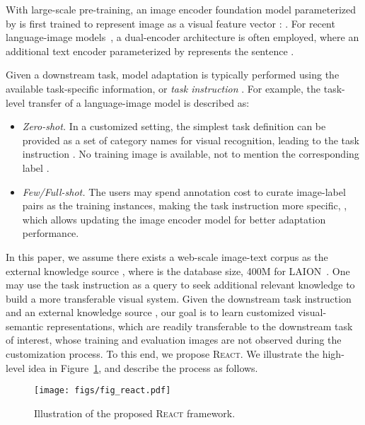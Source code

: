\documentclass[10pt,twocolumn,letterpaper]{article}
\newcommand{\shortname}{\textsc{React}}
\begin{document}
With large-scale pre-training, an image encoder foundation model  parameterized by  is first trained to represent image  as a visual feature vector : . For recent language-image models~\cite{radford2021learning}, a dual-encoder architecture is often employed, where an additional text encoder  parameterized by  represents the sentence .
 
Given a downstream task, model adaptation is typically performed using the available task-specific information, or {\it task instruction} . For example, the task-level transfer of a language-image model is described as:

\begin{itemize}[leftmargin=4.5mm]
\vspace{1mm}
\item {\it Zero-shot.} In a customized setting, the simplest task definition can be provided as a set of category names for visual recognition, leading to the task instruction . No training image  is available, not to mention the corresponding label . 

\vspace{-2mm}
\item {\it Few/Full-shot.} The users may spend annotation cost to curate  image-label pairs as the training instances, making the task instruction more specific,  , which allows updating the image encoder model  for better adaptation performance.

\vspace{1mm}
\end{itemize}

In this paper, we assume there exists a web-scale image-text corpus as the external knowledge source , where  is the database size, \eg 400M for LAION~\cite{schuhmann2021laion}. One may use the task instruction  as a query to seek additional relevant knowledge to build a more transferable visual system.
Given the downstream task instruction  and an external knowledge source , our goal is to learn customized visual-semantic representations, which are readily transferable to the downstream task of interest, whose training and evaluation images are not observed during the customization process. To this end, we propose \shortname{}. We illustrate the high-level idea in Figure~\ref{fig:react}, and describe the process as follows.


\begin{figure}[t]
	\centering
	\texttt{[image: figs/fig\_react.pdf]}
    \vspace{-2mm}
    \caption{Illustration of the proposed \shortname{} framework.}
    \label{fig:react}
    \vspace{-4mm}
\end{figure}
\end{document}
